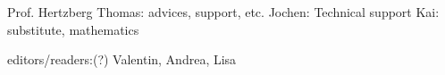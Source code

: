 \documentclass[Thesis.tex]{subfiles}
\begin{document}
Prof. Hertzberg
Thomas: advices, support, etc.
Jochen: Technical support
Kai: substitute, mathematics

editors/readers:(?)
Valentin, Andrea, Lisa
\end{document}
